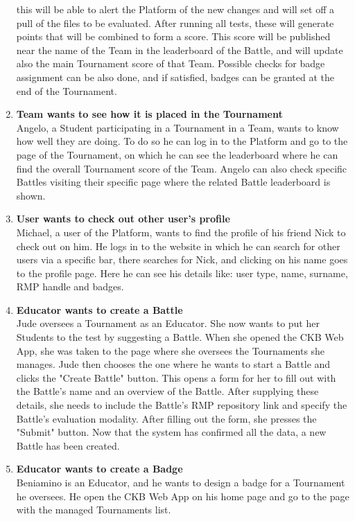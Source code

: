 \begin{enumerate}[label= \textbf{SC\arabic*}]
    this will be able to alert the Platform of the new changes and will set off a pull of the files to be evaluated. After running all tests, these will generate points that will be combined to form a score. This score will be 
    published near the name of the Team in the leaderboard of the Battle, and will update also the main Tournament score of that Team. Possible checks for badge assignment can be also done, and if satisfied, badges can be granted at 
    the end of the Tournament.
    \item \textbf{Team wants to see how it is placed in the Tournament} \label{sc:sc9} \\ Angelo, a Student participating in a Tournament in a Team, wants to know how well they are doing. To do so he can log in to the Platform and go to the page 
    of the Tournament, on which he can see the leaderboard where he can find the overall Tournament score of the Team. Angelo can also check specific Battles visiting their specific page where the related Battle leaderboard is shown.
    \item \textbf{User wants to check out other user's profile} \label{sc:sc10} \\ Michael, a user of the Platform, wants to find the profile of his friend Nick to check out on him. He logs in to the website in which he can search for other users 
    via a specific bar, there searches for Nick, and clicking on his name goes to the profile page. Here he can see his details like: user type, name, surname, RMP handle and badges.
    \item \textbf{Educator wants to create a Battle} \label{sc:sc11} \\Jude oversees a Tournament as an Educator. She now wants to put her Students to the test by suggesting a Battle. When she opened the CKB Web App, she was taken to the page where she 
    oversees the Tournaments she manages. Jude then chooses the one where he wants to start a Battle and clicks the "Create Battle" button. This opens a form for her to fill out with the Battle's name and an overview of the Battle. 
    After supplying these details, she needs to include the Battle's RMP repository link and specify the Battle's evaluation modality. After filling out the form, she presses the "Submit" button. Now that the system has confirmed all 
    the data, a new Battle has been created.
    \item \textbf{Educator wants to create a Badge} \label{sc:sc12} \\Beniamino is an Educator, and he wants to design a badge for a Tournament he oversees. He open the CKB Web App on his home page and go to the page with the managed Tournaments list.

\end{enumerate}
